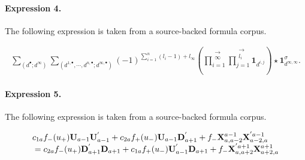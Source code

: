 \documentclass[11pt]{article}
\begin{document}
\paragraph{Expression 4.} The following expression is taken from a source-backed formula corpus.

\begin{align*}\sum_{(d^{\bullet}; d^{\infty})} \sum_{(d^{1, \bullet}, \cdots , d^{n, \bullet} ; d^{\infty, \bullet})} (-1)^{ \sum_{i=1}^n (l_i -1) + l_{\infty}} \left( \prod_{i=1}^{\substack{\longrightarrow \\ \infty}} \prod_{j=1}^{\substack{\longrightarrow \\ l_i}} \mathbf{1}_{d^{i,j}} \right) \star \mathbf{1}_{d^{\infty, \infty}}^{\sigma}.\end{align*}

\paragraph{Expression 5.} The following expression is taken from a source-backed formula corpus.

\begin{align*}\begin{array}{l}c_{1a}f_{-}(u_{+}){\bf U}_{a-1}{\bf U}_{a-1}^{'}+c_{2a}f_{+}(u_{-}){\bf U}_{a-1}{\bf D}_{a+1}^{'}+f_{-}{\bf X}^{a-1}_{a,a-2}{\bf X}^{'a-1}_{a-2,a}\\\text{}=c_{2a}f_{-}(u_{+}){\bf D}_{a+1}^{'}{\bf D}_{a+1}+c_{1a}f_{+}(u_{-}){\bf U}_{a-1}^{'}{\bf D}_{a+1}+f_{-}{\bf X}^{'a+1}_{a,a+2}{\bf X}^{a+1}_{a+2,a}\end{array}\end{align*}
\end{document}
